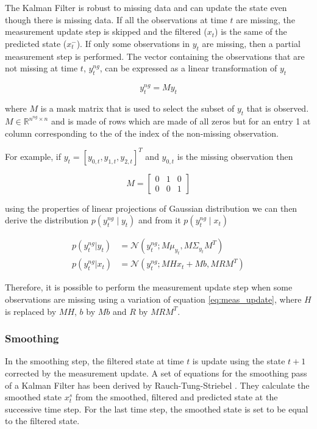 \documentclass{article}
\newcommand{\norm}[3]{\mathcal{N}\left(#1; #2, #3\right)} %
\begin{document}
The Kalman Filter is robust to missing data and can update the state even though there is missing data. 
If all the observations at time $t$ are missing, the measurement update step is skipped and the filtered ($x_t$) is the same of the predicted state ($x_t^-$). If only some observations in $y_t$ are missing, then a partial measurement step is performed.
The vector containing the observations that are not missing at time $t$, $y^{ng}_t$, can be expressed as a linear transformation of $y_t$

\begin{equation}\label{eq:miss_obs}
    y^{ng}_t = My_t
\end{equation}

where $M$ is a mask matrix that is used to select the subset of $y_t$ that is observed. $M \in \mathbb{R}^{n^{ng} \times n}$ and is made of rows which are made of all zeros but for an entry 1 at column corresponding to the of the index of the non-missing observation.

For example, if $y_t = [y_{0,t}, y_{1,t}, y_{2,t}]^T$ and $y_{0,t}$ is the missing observation then

\begin{equation}
 M = \left[\begin{array}{ccc}
    0 & 1 & 0 \\
    0 & 0 & 1
\end{array}\right]
\end{equation}

 using the properties of linear projections of Gaussian distribution we can then derive the distribution $p(y^{ng}_t \mid y_t)$ and from it $p(y^{ng}_t \mid x_t)$ 

\begin{align}
   p(y^{ng}_t|y_t) &= \norm{y^{ng}_t}{M\mu_{y_t}}{M\Sigma_{y_t}M^T} \label{eq:partial_obs}\\
  p(y^{ng}_t|x_t) &= \norm{y^{ng}_t}{MHx_t + Mb}{MRM^T}\label{eq:partial_obs_state}
\end{align}

Therefore, it is possible to perform the measurement update step when some observations are missing using a variation of equation \ref{eq:meas_update}, where $H$ is replaced by $MH$, $b$ by $Mb$ and $R$ by $MRM^T$.

\subsubsection{Smoothing}

In the smoothing step, the filtered state at time $t$ is update using the state ${t+1}$ corrected by the measurement update. A set of equations for the smoothing pass of a Kalman Filter has been derived by Rauch-Tung-Striebel \cite{rauch_maximum_1965}. They calculate the smoothed state $x_t^s$ from the smoothed, filtered and predicted state at the successive time step.
For the last time step, the smoothed state is set to be equal to the filtered state.
\end{document}
